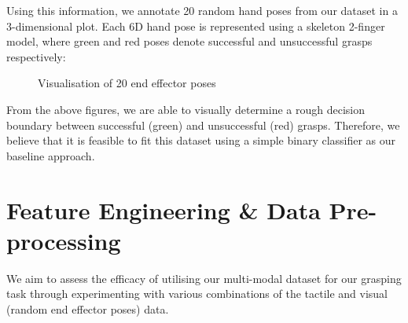 \documentclass[11pt, a4paper]{report}
\theoremstyle{definition}
\begin{document}
\noindent Using this information, we annotate 20 random hand poses from our dataset in a 3-dimensional plot. Each 6D hand pose is represented using a skeleton 2-finger model, where green and red poses denote successful and unsuccessful grasps respectively:
\begin{figure}[H]%
    \centering
    \qquad
    \caption{Visualisation of 20 end effector poses}%
    \label{fig:4.4}%
\end{figure}
\noindent From the above figures, we are able to visually determine a rough decision boundary between successful (green) and unsuccessful (red) grasps. Therefore, we believe that it is feasible to fit this dataset using a simple binary classifier as our baseline approach.


\section{Feature Engineering \& Data Pre-processing}
\label{sec:4.4}
We aim to assess the efficacy of utilising our multi-modal dataset for our grasping task through experimenting with various combinations of the tactile and visual (random end effector poses) data.
\end{document}
